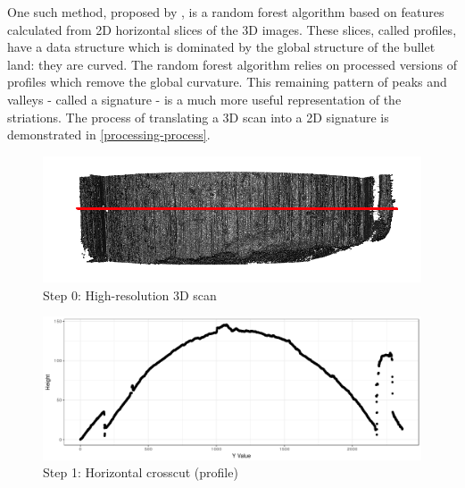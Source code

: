 \documentclass[12pt]{article}
\begin{document}
One such method, proposed by \citet{Hare1}, is a random forest algorithm
based on features calculated from 2D horizontal slices of the 3D images.
These slices, called profiles, have a data structure which is dominated
by the global structure of the bullet land: they are curved. The random
forest algorithm relies on processed versions of profiles which remove
the global curvature. This remaining pattern of peaks and valleys -
called a signature - is a much more useful representation of the
striations. The process of translating a 3D scan into a 2D signature is
demonstrated in \autoref{processing-process}.

\begin{figure}
\begin{minipage}[b]{0.45\linewidth}
    \raggedleft
    \includegraphics[width=\textwidth]{../images/3d_plot_top_crosscut.png}
    \centering
    Step 0: High-resolution 3D scan
\end{minipage}
\hspace{.2cm}
\begin{minipage}[b]{0.45\linewidth}
    \raggedright
    \includegraphics[width=\textwidth]{../images/Profile_1.png}
    \centering
    Step 1: Horizontal crosscut (profile)
\end{minipage}
\vspace{.6cm}


\end{figure}
\end{document}
